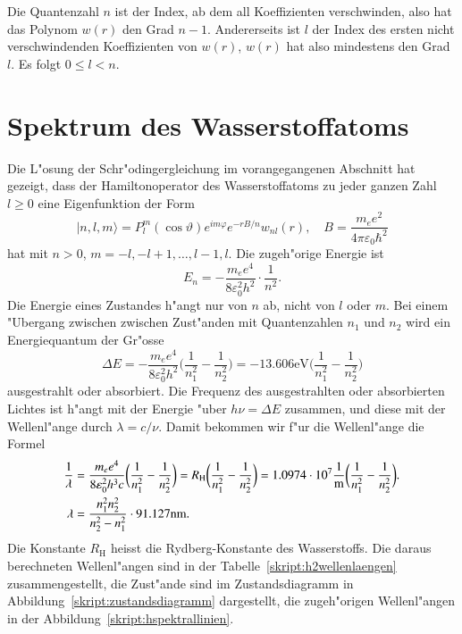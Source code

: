 Die Quantenzahl $n$ ist der Index, ab dem all Koeffizienten verschwinden,
also hat das Polynom $w(r)$ den Grad $n-1$.
Andererseits ist $l$ der Index des ersten nicht verschwindenden Koeffizienten
von $w(r)$, $w(r)$ hat also mindestens den Grad $l$. Es folgt $0\le l < n$.

\section{Spektrum des Wasserstoffatoms}
Die L"osung der Schr"odingergleichung im vorangegangenen Abschnitt
hat gezeigt, dass der Hamiltonoperator des Wasserstoffatoms zu jeder ganzen
Zahl $l\ge 0$ eine Eigenfunktion der Form
\[
|n,l,m\rangle
=
P_l^m(\cos\vartheta) e^{im\varphi}e^{-rB/n}w_{nl}(r)
,\quad
B=\frac{m_ee^2}{4\pi\varepsilon_0\hbar^2}
\]
hat mit $n>0$, $m=-l,-l+1,\dots,l-1,l$.
Die zugeh"orige Energie ist
\[
E_n=-\frac{m_ee^4}{8\varepsilon_0^2h^2}\cdot \frac1{n^2}.
\]
Die Energie eines Zustandes h"angt nur von $n$ ab, nicht von $l$ oder $m$.
Bei einem "Ubergang zwischen zwischen Zust"anden mit Quantenzahlen $n_1$ und
$n_2$ wird ein Energiequantum der Gr"osse
\begin{equation}
\Delta E
=
-\frac{m_ee^4}{8\varepsilon_0^2h^2}
\biggl(
\frac{1}{n_1^2}
-
\frac{1}{n_2^2}
\biggr)
=
-13.606\text{eV}
\biggl(
\frac{1}{n_1^2}
-
\frac{1}{n_2^2}
\biggr)
\end{equation}
ausgestrahlt oder absorbiert.
Die Frequenz des ausgestrahlten oder absorbierten Lichtes ist h"angt
mit der Energie "uber $h\nu=\Delta E$ zusammen, und diese mit der
Wellenl"ange durch $\lambda = c/\nu$.
Damit bekommen wir f"ur die Wellenl"ange die Formel
\begin{align}
\frac{1}{\lambda}
&=
\frac{m_ee^4}{8\varepsilon_0^2h^3c}
\biggl(
\frac{1}{n_1^2}
-
\frac{1}{n_2^2}
\biggr)
=
R_{\text{H}}
\biggl(
\frac{1}{n_1^2}
-
\frac{1}{n_2^2}
\biggr)
=
1.0974\cdot 10^7\frac1{\text{m}}
\biggl(
\frac{1}{n_1^2}
-
\frac{1}{n_2^2}
\biggr).
\notag
\\
\lambda
&=
\frac{n_1^2n_2^2}{n_2^2-n_1^2}
\cdot
91.127\text{nm}.
\label{skript:wellenlaengenformel}
\end{align}
Die Konstante $R_{\text{H}}$ heisst die Rydberg-Konstante des
Wasserstoffs.
Die daraus berechneten Wellenl"angen sind in der
Tabelle~\ref{skript:h2wellenlaengen} zusammengestellt, die
Zust"ande sind im Zustandsdiagramm in Abbildung~\ref{skript:zustandsdiagramm}
dargestellt, die zugeh"origen Wellenl"angen in der
Abbildung~\ref{skript:hspektrallinien}.
